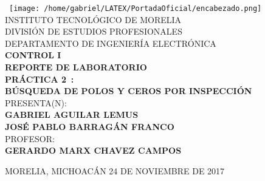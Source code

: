 \newcommand{\materia}{\uppercase{Control i}}
\newcommand{\maestro}{\uppercase{Gerardo Marx Chavez Campos}}

\newcommand{\tipoDoc}{\uppercase{REPORTE DE LABORATORIO}} %
\newcommand{\nombreDoc}{\uppercase{Práctica 2}} 
\newcommand{\docNum}{}
\newcommand{\subNombreDoc}{\uppercase{Búsqueda de polos y ceros por inspección}}

\newcommand{\alumnos}{\uppercase{GABRIEL AGUILAR LEMUS \\ josé pablo barragán franco}}
\newcommand{\fecha}{\uppercase{24 de Noviembre de 2017}}

\begin{center}
	\
	\texttt{[image: /home/gabriel/LATEX/PortadaOficial/encabezado.png]}
	\huge INSTITUTO TECNOLÓGICO DE MORELIA \\
	\vfill
	\large DIVISIÓN DE ESTUDIOS PROFESIONALES  \\
	\vfill
	\large  DEPARTAMENTO DE INGENIERÍA ELECTRÓNICA \\ 
	\vfill
	\Large \textbf \materia \\
	\vfill
	\textbf{\tipoDoc} \\
	\vfill 
	\LARGE  \textbf{ \nombreDoc  \, \docNum: \\ \subNombreDoc} \\
	\vfill
	\large PRESENTA(N): \\
	\LARGE  \textbf{\alumnos} \\
	\vfill
	\large PROFESOR: \\
	\Large \textbf{\maestro }
	\vfill 
	\begin{flushleft}
		MORELIA, MICHOACÁN \hfill \uppercase{\fecha}
	\end{flushleft}
	\pagebreak
\end{center}